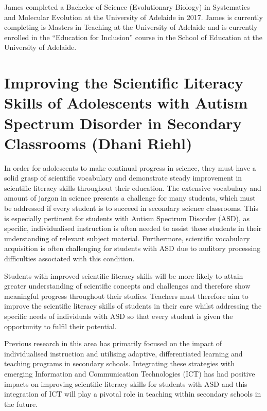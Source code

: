 \documentclass[twoside,14pt,a4paper,notitlepage]{memoir}
\begin{document}
James completed a Bachelor of Science (Evolutionary Biology) in Systematics and Molecular Evolution at the University of Adelaide in 2017. James is currently completing is Masters in Teaching at the University of Adelaide and is currently enrolled in the “Education for Inclusion” course in the School of Education at the University of Adelaide.



\section*{Improving the Scientific Literacy Skills of Adolescents with Autism Spectrum Disorder in Secondary Classrooms (Dhani Riehl)}
\label{aut:riehl}

In order for adolescents to make continual progress in science, they must have a solid grasp of scientific vocabulary and demonstrate steady improvement in scientific literacy skills throughout their education. The extensive vocabulary and amount of jargon in science presents a challenge for many students, which must be addressed if every student is to succeed in secondary science classrooms. This is especially pertinent for students with Autism Spectrum Disorder (ASD), as specific, individualised instruction is often needed to assist these students in their understanding of relevant subject material. Furthermore, scientific vocabulary acquisition is often challenging for students with ASD due to auditory processing difficulties associated with this condition.

Students with improved scientific literacy skills will be more likely to attain greater understanding of scientific concepts and challenges and therefore show meaningful progress throughout their studies. Teachers must therefore aim to improve the scientific literacy skills of students in their care whilst addressing the specific needs of individuals with ASD so that every student is given the opportunity to fulfil their potential.

Previous research in this area has primarily focused on the impact of individualised instruction and utilising adaptive, differentiated learning and teaching programs in secondary schools. Integrating these strategies with emerging Information and Communication Technologies (ICT) has had positive impacts on improving scientific literacy skills for students with ASD and this integration of ICT will play a pivotal role in teaching within secondary schools in the future.
\end{document}
